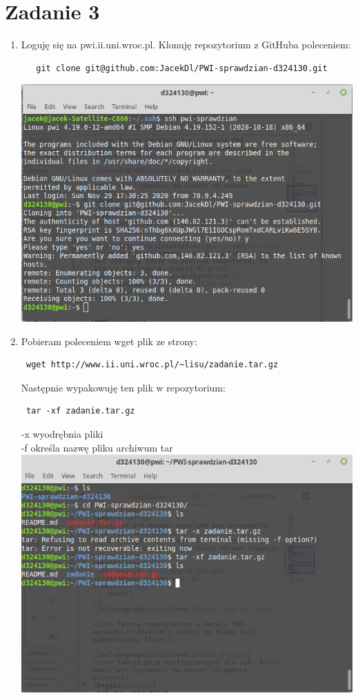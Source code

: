 \documentclass{article}
\begin{document}
 \section*{Zadanie 3}
 \begin{enumerate}
  \item Loguję się na pwi.ii.uni.wroc.pl. Klonuję repozytorium z GitHuba poleceniem:
  \begin{verbatim}
   git clone git@github.com:JacekDl/PWI-sprawdzian-d324130.git
  \end{verbatim}
\includegraphics[scale=0.4]{gitclone.png}
\item Pobieram poleceniem wget plik ze strony:
\begin{verbatim}
 wget http://www.ii.uni.wroc.pl/~lisu/zadanie.tar.gz
\end{verbatim}
Następnie wypakowuję ten plik w repozytorium:
\begin{verbatim}
 tar -xf zadanie.tar.gz
\end{verbatim}
-x wyodrębnia pliki\\
-f określa nazwę pliku archiwum tar\\
\includegraphics[scale=0.4]{tar.png}\\

\end{enumerate}
\end{document}
